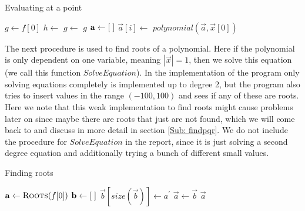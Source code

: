 \begin{algorithm}[H]
  \caption{Evaluating at a point}
  \begin{algorithmic}[1]
        \State $g\gets f[0]$
          \State $h\gets$ 
          \State $g\gets$ 
        \EndFor
        \State \Return $g$
      \Else
        \State $\mathbf{a}\gets[\hspace*{1mm}]$
          \State $\vec{a}[i]\gets$ 
        \EndFor
        \State \Return $polynomial(\vec{a},\vec{x}[0])$
      \EndIf
    \EndProcedure
  \end{algorithmic}
\end{algorithm}

The next procedure is used to find roots of a polynomial. Here if the polynomial is only dependent on one variable, meaning $|\vec{x}|=1$, then we solve this equation (we call this function $SolveEquation$). In the implementation of the program only solving equations completely is implemented up to degree 2, but the program also tries to insert values in the range $(-100,100)$ and sees if any of these are roots. Here we note that this weak implementation to find roots might cause problems later on since maybe there are roots that just are not found, which we will come back to and discuss in more detail in section \ref{Sub: findpqr}. We do not include the procedure for $SolveEquation$ in the report, since it is just solving a second degree equation and additionally trying a bunch of different small values.
\begin{algorithm}[H]
  \caption{Finding roots}
  \label{Alg: Roots}
  \begin{algorithmic}[1]
        \State \Return {}
      \Else
        \State $\vec{a}\gets \Call{Roots}{f[0]}$
          \State $\mathbf{b}\gets [\hspace*{1mm}]$
              \State $\vec{b}[size(\vec{b})]\gets a^\prime$
            \EndIf
          \EndFor
          \State $\vec{a}\gets \vec{b}$
        \EndFor
        \State \Return $\vec{a}$
      \EndIf
    \EndProcedure
  \end{algorithmic}
\end{algorithm}

